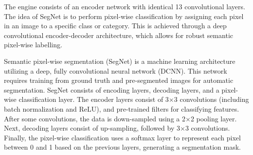 The engine consists of an encoder network with identical 13 convolutional layers. The idea of SegNet is to perform pixel-wise classification by assigning each pixel in an image to a specific class or category. This is achieved through a deep convolutional encoder-decoder architecture, which allows for robust semantic pixel-wise labelling.

Semantic pixel-wise segmentation (SegNet) is a machine learning architecture utilizing a deep, fully convolutional neural network (DCNN). This network requires training from ground truth and pre-segmented images for automatic segmentation. SegNet consists of encoding layers, decoding layers, and a pixel-wise classification layer. The encoder layers consist of 3$\times$3 convolutions (including batch normalization and ReLU), and pre-trained filters for classifying features. After some convolutions, the data is down-sampled using a 2$\times$2 pooling layer. Next, decoding layers consist of up-sampling, followed by 3$\times$3 convolutions. Finally, the pixel-wise classification uses a softmax layer to represent each pixel between 0 and 1 based on the previous layers, generating a segmentation mask.

